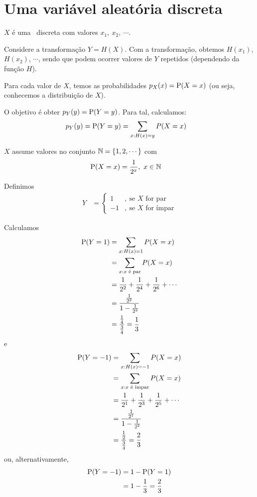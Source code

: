 \section{Uma variável aleatória discreta}

$X$ é uma \va\ discreta com valores $x_1,\ x_2,\ \cdots$.

Considere a transformação $Y = H(X)$. Com a transformação,
obtemos $H(x_1)$, $H(x_2)$, $\cdots$, sendo que podem ocorrer
valores de $Y$ repetidos (dependendo da função $H$).

Para cada valor de $X$, temos as probabilidades $p_X(x) = \operatorname{P}(X = x)$
(ou seja, conhecemos a distribuição de $X$).

O objetivo é obter $p_Y(y) = \operatorname{P}(Y = y)$. Para tal, calculamos:
\begin{align}
    p_Y(y) = \operatorname{P}(Y = y)
    &= \sum_{x: H(x) = y} P(X = x)
    \label{eq:ch04-trans-discreta}
\end{align}

\begin{example}\label{exp:ch04-trans-discreta-1}
    $X$ assume valores no conjunto $\operatorname{\mathbb{N}} = \{1, 2, \cdots \}$ com
    \begin{align*}
        \operatorname{P}(X = x) &= \frac{1}{2^x},\ x \in \operatorname{\mathbb{N}}
    \end{align*}

    Definimos
    \begin{align*}
        Y &= \begin{cases}
            1  &,\ \text{se $X$ for par} \\
            -1 &,\ \text{se $X$ for ímpar}
        \end{cases}
    \end{align*}

    Calculamos
    \begin{align*}
        \operatorname{P}(Y = 1) &= \sum_{x: H(x) = 1} P(X = x) \\
        &= \sum_{x: x \text{ é par}} P(X = x) \\
        &= \frac{1}{2^2} + \frac{1}{2^4} + \frac{1}{2^6} + \cdots \\
        &= \frac{\frac{1}{2^2}}{1 - \frac{1}{2^2}} \\
        &= \frac{\frac{1}{4}}{\frac{3}{4}} = \frac{1}{3}
    \end{align*}
    e
    \begin{align*}
        \operatorname{P}(Y = -1) &= \sum_{x: H(x) = -1} P(X = x) \\
        &= \sum_{x: x \text{ é impar}} P(X = x) \\
        &= \frac{1}{2^1} + \frac{1}{2^3} + \frac{1}{2^5} + \cdots \\
        &= \frac{\frac{1}{2^1}}{1 - \frac{1}{2^2}} \\
        &= \frac{\frac{1}{2}}{\frac{3}{4}} = \frac{2}{3}
    \end{align*}
    ou, alternativamente,
    \begin{align*}
        \operatorname{P}(Y = -1) &= 1 - \operatorname{P}(Y = 1) \\
        &= 1 - \frac{1}{3} = \frac{2}{3}
    \end{align*}
\end{example}

